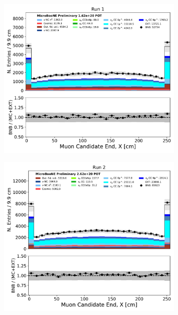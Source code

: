 \begin{figure}[hbt!] 
\begin{center}
    \begin{subfigure}[b]{0.35\textwidth}
        \centering
        \includegraphics[width=1.00\textwidth]{NuMuCCsel/Images/Ryan/Run1/trk_sce_end_x_v_08052020_presel_samples_longest_noCRT_event_category.pdf}
    \end{subfigure}
    \begin{subfigure}[b]{0.35\textwidth}
        \centering
        \includegraphics[width=1.00\textwidth]{NuMuCCsel/Images/Ryan/Run2/trk_sce_end_x_v_08052020_presel_samples_longest_noCRT_event_category.pdf}

\end{subfigure}
\end{center}
\end{figure}
